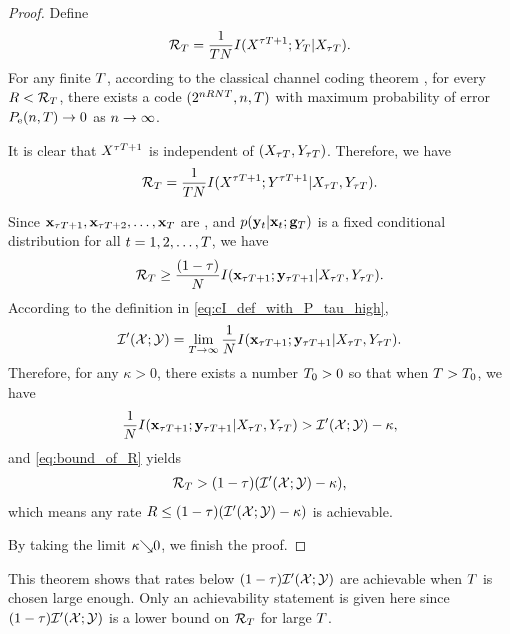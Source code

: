 \documentclass[12pt, draftclsnofoot,journal,onecolumn]{IEEEtran}
\begin{document}
\begin{proof}
Define 
\begin{equation*}
    \mathcal{R}_{T}=\frac{1}{TN}I(X^{{\tau T}+1};Y_{T}|X_{{\tau T}}).
\end{equation*}
For any finite $T$, according to the classical channel coding theorem \cite{cover2012elements,yeung2008information,effros2010generalizing}, for every $R<\mathcal{R}_{T}$, there exists a code $(2^{n R N T},n,T)$ with maximum probability of error $P_{\rm e}(n,T)\to 0$ as $n\rightarrow\infty$. 

It is clear that $X^{{\tau T}+1}$ is independent of $(X_{{\tau T}},Y_{{\tau T}})$. Therefore, we have
\begin{equation*}
    \mathcal{R}_{T}=\frac{1}{TN}I(X^{{\tau T}+1};Y^{{\tau T}+1}|X_{{\tau T}},Y_{{\tau T}}).
\end{equation*}

Since ${\mathbf{x}}_{{\tau T}+1},{\mathbf{x}}_{{\tau T}+2},\ldots,{\mathbf{x}}_{T}$ are \iid, and $p({\mathbf{y}}_t|{\mathbf{x}}_t;{\mathbf{g}}_{T})$ is a fixed conditional distribution for all $t=1,2,\ldots,T$, we have 
\begin{equation}
    \mathcal{R}_{T}\geq \frac{(1-\tau)}{N}I({\mathbf{x}}_{{\tau T}+1};{\mathbf{y}}_{{\tau T}+1}|X_{{\tau T}},Y_{{\tau T}}).
    \label{eq:bound_of_R}
\end{equation}
According to the definition in \eqref{eq:cI_def_with_P_tau_high},
\begin{align*}
     \mathcal{I}{'}({\mathcal{X}};{\mathcal{Y}}{})=\lim_{T\to\infty} \frac{1}{N} I({\mathbf{x}}_{{\tau T}+1};{\mathbf{y}}_{{\tau T}+1}|X_{{\tau T}},Y_{{\tau T}}).
\end{align*}
Therefore, for any $\kappa>0$, there exists a number $T_0>0$ so that when $T>T_0$, we have
\begin{align*}
    \frac{1}{N}I({\mathbf{x}}_{{\tau T}+1};{\mathbf{y}}_{{\tau T}+1}|X_{{\tau T}},Y_{{\tau T}})>\mathcal{I}{'}({\mathcal{X}};{\mathcal{Y}}{}) - \kappa,
\end{align*}
and \eqref{eq:bound_of_R} yields
\begin{align*}
    \mathcal{R}_{T}>(1-\tau)(\mathcal{I}{'}({\mathcal{X}};{\mathcal{Y}}{}) - \kappa),
\end{align*}
which means any rate $R\leq(1-\tau)(\mathcal{I}{'}({\mathcal{X}};{\mathcal{Y}}{}) - \kappa)$ is achievable. 

By taking the limit $\kappa{\searrow} 0$, we finish the proof.
\end{proof} 

This theorem shows that rates below $(1-\tau)\mathcal{I}{'}({\mathcal{X}};{\mathcal{Y}}{})$ are achievable when $T$ is chosen large enough.  Only an achievability statement is given here since $(1-\tau)\mathcal{I}{'}({\mathcal{X}};{\mathcal{Y}}{})$ is a lower bound on $\mathcal{R}_{T}$ for large $T$. 
\end{document}
